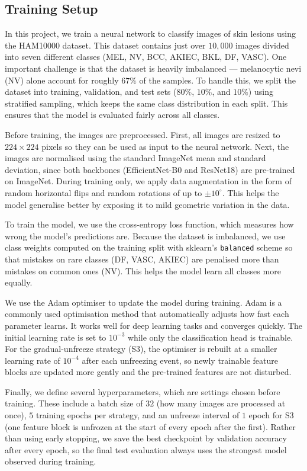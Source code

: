 \documentclass{article}
\begin{document}
\subsection{Training Setup}

In this project, we train a neural network to classify images of skin
lesions using the HAM10000 dataset. This dataset contains just over $10{,}000$
images divided into seven different classes (MEL, NV, BCC, AKIEC, BKL, DF,
VASC). One important challenge is that the dataset is heavily imbalanced ---
melanocytic nevi (NV) alone account for roughly $67\%$ of the samples. To
handle this, we split the dataset into training, validation, and test sets
($80\%$, $10\%$, and $10\%$) using stratified sampling, which keeps the same
class distribution in each split. This ensures that the model is evaluated
fairly across all classes.

Before training, the images are preprocessed. First, all images are resized
to $224\times224$ pixels so they can be used as input to the neural network.
Next, the images are normalised using the standard ImageNet mean and
standard deviation, since both backbones (EfficientNet-B0 and ResNet18) are
pre-trained on ImageNet. During training only, we apply data augmentation in
the form of random horizontal flips and random rotations of up to $\pm
10^{\circ}$. This helps the model generalise better by exposing it to mild
geometric variation in the data.

To train the model, we use the cross-entropy loss function, which measures
how wrong the model's predictions are. Because the dataset is imbalanced, we
use class weights computed on the training split with sklearn's
\texttt{balanced} scheme so that mistakes on rare classes (DF, VASC, AKIEC)
are penalised more than mistakes on common ones (NV). This helps the model
learn all classes more equally.

We use the Adam optimiser to update the model during training. Adam is a
commonly used optimisation method that automatically adjusts how fast each
parameter learns. It works well for deep learning tasks and converges
quickly. The initial learning rate is set to $10^{-3}$ while only the
classification head is trainable. For the gradual-unfreeze strategy (S3),
the optimiser is rebuilt at a smaller learning rate of $10^{-4}$ after each
unfreezing event, so newly trainable feature blocks are updated more gently
and the pre-trained features are not disturbed.

Finally, we define several hyperparameters, which are settings chosen before
training. These include a batch size of $32$ (how many images are processed
at once), $5$ training epochs per strategy, and an unfreeze interval of $1$
epoch for S3 (one feature block is unfrozen at the start of every epoch
after the first). Rather than using early stopping, we save the best
checkpoint by validation accuracy after every epoch, so the final test
evaluation always uses the strongest model observed during training.
\end{document}
